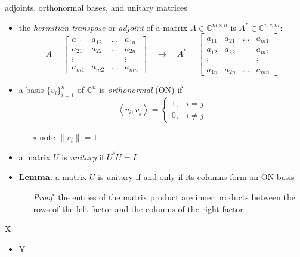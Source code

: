 \documentclass[10pt,hyperref]{beamer}
\newcommand{\CC}{\mathbb{C}}
\newcommand{\ip}[2]{\left<#1,#2\right>}
\begin{document}
\begin{frame}{adjoints, orthonormal bases, and unitary matrices}

\begin{itemize}
\item the \emph{hermitian transpose} or \emph{adjoint} of a matrix $A\in \CC^{m\times n}$ is $A^* \in \CC^{n\times m}$:
    $$A = \begin{bmatrix}
    a_{11} & a_{12} & \dots & a_{1n} \\
    a_{21} & a_{22} & \dots & a_{2n} \\
    \vdots &        &       & \vdots \\
    a_{m1} & a_{m2} & \dots & a_{mn} \end{bmatrix}
    \quad \to \quad
    A^* = \begin{bmatrix}
    \overline{a_{11}} & \overline{a_{21}} & \dots & \overline{a_{m1}} \\
    \overline{a_{12}} & \overline{a_{22}} &       & \overline{a_{m2}} \\
    \vdots            &                   &       & \vdots \\
    \overline{a_{1n}} & \overline{a_{2n}} & \dots & \overline{a_{mn}} \end{bmatrix}$$
\item a basis $\{v_i\}_{i=1}^n$ of $\CC^n$ is \emph{orthonormal} (ON) if
\small
    $$\ip{v_i}{v_j} = \begin{cases} 1, & i=j \\ 0, & i\ne j \end{cases}$$
\normalsize
\vspace{-2mm}
    \begin{itemize}
    \item[$\circ$] note $\|v_i\|=1$
    \end{itemize}
\item a matrix $U$ is \emph{unitary} if $U^* U = I$
\item \textbf{Lemma.} a matrix $U$ is unitary if and only if its columns form an ON basis
    \begin{itemize}
    \item[\emph{Proof.}] the entries of the matrix product are inner products between the rows of the left factor and the columns of the right factor
    \end{itemize}
\end{itemize}
\end{frame}

\begin{frame}{X}

\begin{itemize}
\item Y
\end{itemize}
\end{frame}
\end{document}

